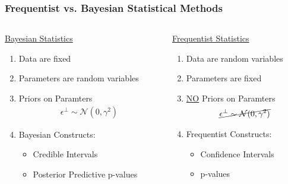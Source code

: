 \documentclass[11pt,t]{beamer}
\begin{document}
\begin{frame}
  \frametitle{Frequentist vs. Bayesian Statistical Methods}
  \begin{columns}
    \begin{column}{0.5\textwidth}
      \begin{center}
        \underline{Bayesian Statistics}
      \end{center}
      \begin{enumerate}
        \item Data are fixed
        \item Parameters are random variables
        \item Priors on Paramters
          \begin{align*}
            \epsilon^\perp \sim \mathcal{N}(0, \gamma^2)
          \end{align*}
          \item Bayesian Constructs:
          \begin{itemize}
            \item Credible Intervals
            \item Posterior Predictive p-values
          \end{itemize}
      \end{enumerate}
    \end{column}
    \vrule{}
    \begin{column}{0.5\textwidth}  %
      \begin{center}
        \underline{Frequentist Statistics}
      \end{center}
      \begin{enumerate}
        \item Data are random variables
        \item Parameters are fixed
          \vspace{14px}
        \item \underline{NO} Priors on Paramters
          \begin{align*}
            \cancel{\epsilon^\perp \sim \mathcal{N}(0, \gamma^2)}
          \end{align*}
        \item Frequentist Constructs:
          \begin{itemize}
            \item Confidence Intervals
            \item p-values
          \end{itemize}
      \end{enumerate}
    \end{column}
  \end{columns}
\end{frame}
\end{document}
